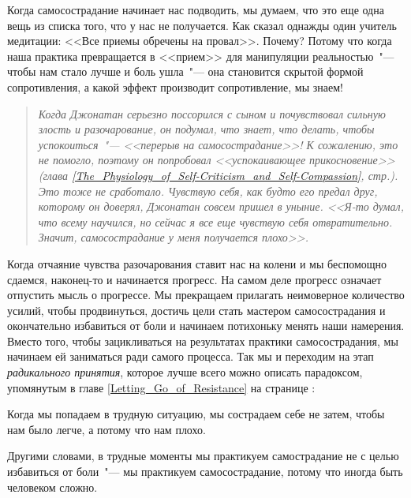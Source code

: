 Когда самосострадание начинает нас подводить, мы думаем, что это еще одна вещь из списка того, что у нас не получается. Как сказал однажды один учитель медитации: <<Все приемы обречены на провал>>. Почему? Потому что когда наша практика превращается в <<прием>> для манипуляции реальностью~"--- чтобы нам стало лучше и боль ушла~"--- она становится скрытой формой сопротивления, а какой эффект производит сопротивление, мы знаем! 

\begin{quotation}
	\textit{
		Когда Джонатан серьезно поссорился с сыном и почувствовал сильную злость и разочарование, он подумал, что знает, что делать, чтобы успокоиться~"--- <<перерыв на самосострадание>>! К сожалению, это не помогло, поэтому он попробовал <<успокаивающее прикосновение>> (глава \ref{The_Physiology_of_Self-Criticism_and_Self-Compassion}, стр.\:\pageref{IP:Soothing_Touch}). Это тоже не сработало. Чувствую себя, как будто его предал друг, которому он доверял, Джонатан совсем пришел в уныние. <<Я-то думал, что всему научился, но сейчас я все еще чувствую себя отвратительно. Значит, самосострадание у меня получается плохо>>.  
	}
\end{quotation}

Когда отчаяние чувства разочарования ставит нас на колени и мы беспомощно сдаемся, наконец-то и начинается прогресс. На самом деле прогресс означает отпустить мысль о прогрессе. Мы прекращаем прилагать неимоверное количество усилий, чтобы продвинуться, достичь цели стать мастером самосострадания и окончательно избавиться от боли и начинаем потихоньку менять наши намерения. Вместо того, чтобы зацикливаться на результатах практики самосострадания, мы начинаем ей заниматься ради самого процесса. Так мы и переходим на этап \emph{радикального принятия}, которое лучше всего можно описать парадоксом, упомянутым в главе \ref{Letting_Go_of_Resistance} на странице \pageref{Letting_Go_of_Resistance}: 

\vspace{4ex}

\begin{center}
	{\Large Когда мы попадаем в трудную ситуацию, мы сострадаем себе не затем, чтобы нам было легче, а потому что нам плохо.}
\end{center}

\vspace{4ex}

Другими словами, в трудные моменты мы практикуем самострадание не с целью избавиться от боли~"--- мы практикуем самосострадание, потому что иногда быть человеком сложно.

